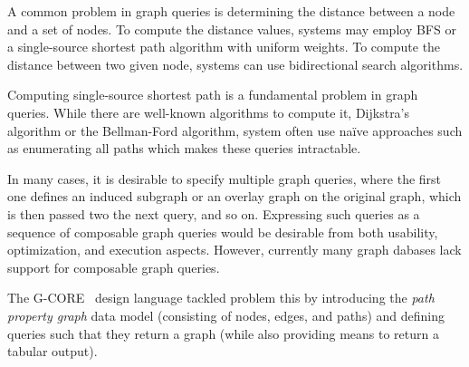 



A common problem in graph queries is determining the distance between a node and a set of nodes. To compute the distance values, systems may employ BFS or a single-source shortest path algorithm with uniform weights.
To compute the distance between two given node, systems can use bidirectional search algorithms.





Computing single-source shortest path is a fundamental problem in graph queries. While there are well-known algorithms to compute it, \eg Dijkstra's algorithm or the Bellman-Ford algorithm, system often use na\"ive approaches such as enumerating all paths which makes these queries intractable.





In many cases, it is desirable to specify multiple graph queries, where the first one defines an induced subgraph or an overlay graph on the original graph, which is then passed two the next query, and so on.
Expressing such queries as a sequence of composable graph queries would be desirable from both usability, optimization, and execution aspects. However, currently many graph dabases lack support for composable graph queries.

The \mbox{G-CORE}~\cite{DBLP:conf/sigmod/AnglesABBFGLPPS18} design language tackled problem this by introducing the \emph{path property graph} data model (consisting of nodes, edges, and paths) and defining queries such that they return a graph (while also providing means to return a tabular output).



% 

